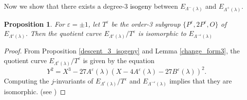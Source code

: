 \documentclass[a4paper, 11pt]{article}
\newtheorem{rem}[defn]{Remark}
\theoremstyle{plain}
\newtheorem{prop}[defn]{Proposition}
\newcommand{\?}{\textcolor{red}{??}}
\newcommand{\lm}{\lambda}
\newcommand{\Lm}{\Lambda}
\begin{document}
    
Now we show that there exists \textcolor{black}{a} degree-$3$ \textcolor{black}{isogeny} between $E_{\Lambda^{-}(\lm)}$ and $E_{{\Lambda^{+}(\lm)}}$. 
\begin{prop}
For $\varepsilon=\pm1$, let $T^{\varepsilon}$ be the order-3 subgroup $\{P^{\varepsilon},2P^{\varepsilon},O\}$ of $E_{\Lambda^{\varepsilon}(\lm)}$. Then the quotient curve $E_{\Lambda^{\varepsilon}(\lm)}/T^{\varepsilon}$ is isomorphic to $E_{{\Lambda^{-\varepsilon}(\lm)}}$
\end{prop}

\begin{proof}
    From Proposition \ref{descent_3_isogeny} and Lemma \ref{change_form3}, the quotient curve $E_{\Lambda^{\varepsilon}(\lm)}/T^{\varepsilon}$ is given by the equation
    \[
    Y^2=X^3-27A^{\varepsilon}(\lm)\left(X-4A^{\varepsilon}(\lm)-27B^{\varepsilon}(\lm)\right)^2.
    \]
    Computing the $j$-invariants of $E_{\Lambda^{\varepsilon}(\lm)}/T^{\varepsilon}$ and $E_{{\Lambda^{-\varepsilon}(\lm)}}$ implies that they are isomorphic. (see \cite[4-1,4-2]{Github}) 
\end{proof}

\end{document}
